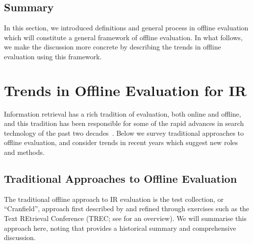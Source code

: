 \subsection{Summary}
In this section, we introduced definitions and general process in offline evaluation which will constitute a general framework of offline evaluation. In what follows, we make the discussion more concrete by describing the trends in offline evaluation using this framework.

\section{Trends in Offline Evaluation for IR}

Information retrieval has a rich tradition of evaluation, both online and offline, and this tradition has been responsible for some of the rapid advances in search technology of the past two decades~\citep{TRECimpact}. Below we survey traditional approaches to offline evaluation, and consider trends in recent years which suggest new roles and methods.

\subsection{Traditional Approaches to Offline Evaluation}
The traditional offline approach to IR evaluation is the test collection, or ``Cranfield'', approach first described by \cite{cleverdon67} and refined through exercises such as the Text REtrieval Conference (TREC; see \cite{voor:trec05} for an overview).  We will summarise this approach here, noting that \cite{INR-009} provides a historical summary and comprehensive discussion.

